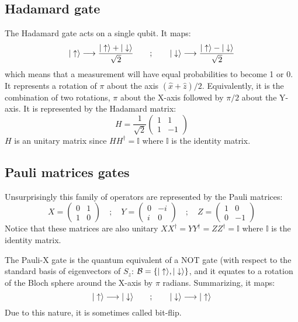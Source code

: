\subsection{Hadamard gate}
The Hadamard gate acts on a single qubit. It maps:
\begin{equation}
  |\uparrow\rangle \longrightarrow \frac{|\uparrow\rangle+|\downarrow\rangle}{\sqrt{2}} \quad\quad;\quad\quad
  |\downarrow\rangle \longrightarrow \frac{|\uparrow\rangle-|\downarrow\rangle}{\sqrt{2}}
\end{equation}
which means that a measurement will have equal probabilities to become 1 or 0.
It represents a rotation of $\pi$ about the axis $(\hat{x}+\hat{z})/ 2$.
Equivalently, it is the combination of two rotations, $\pi$ about the X-axis followed by $\pi /2$ about the Y-axis. It is represented by the Hadamard matrix:
\begin{equation}
  H=\frac{1}{\sqrt{2}}\left(\begin{array}{cc}
  1 & 1 \\
  1 & -1
  \end{array}\right)
\end{equation}
$H$ is an unitary matrix since $HH^\dagger=\mathbb{I}$ where $\mathbb{I}$ is the identity matrix.

\subsection{Pauli matrices gates}
Unsurprisingly this family of operators are represented by the Pauli matrices:
\begin{equation}
  X = \left(\begin{array}{cc}
  0 & 1 \\
  1 & 0
  \end{array}\right)\quad;\quad
  Y = \left(\begin{array}{cc}
  0 & -i \\
  i & 0
  \end{array}\right)\quad;\quad
  Z = \left(\begin{array}{cc}
  1 & 0 \\
  0 & -1
  \end{array}\right)
\end{equation}
Notice that these matrices are also unitary $XX^\dagger=YY^\dagger=ZZ^\dagger= \mathbb{I}$ where $\mathbb{I}$ is the identity matrix.

The Pauli-X gate is the quantum equivalent of a NOT gate (with respect to the standard basis of eigenvectors of $S_z$: $\mathcal{B}=\left\{|\uparrow\rangle,|\downarrow\rangle\right\}$, and it equates to a rotation of the Bloch sphere around the X-axis by $\pi$ radians. Summarizing, it maps:
\begin{equation}
  |\uparrow\rangle \longrightarrow |\downarrow\rangle \quad\quad;\quad\quad
  |\downarrow\rangle \longrightarrow |\uparrow\rangle
\end{equation}
Due to this nature, it is sometimes called bit-flip.

